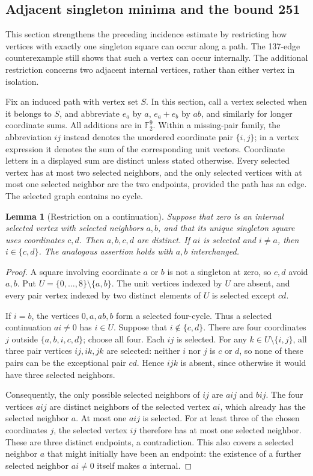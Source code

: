 \documentclass[11pt,a4paper]{article}
\newtheorem{lemma}[theorem]{Lemma}
\theoremstyle{definition}
\theoremstyle{remark}
\begin{document}
\subsection{Adjacent singleton minima and the bound 251}
This section strengthens the preceding incidence estimate by restricting how vertices with exactly one singleton square can occur along a path. The 137-edge counterexample still shows that such a vertex can occur internally. The additional restriction concerns two adjacent internal vertices, rather than either vertex in isolation.

Fix an induced path with vertex set $S$. In this section, call a vertex selected when it belongs to $S$, and abbreviate $e_a$ by $a$, $e_a+e_b$ by $ab$, and similarly for longer coordinate sums. All additions are in $\mathbb F_2^9$. Within a missing-pair family, the abbreviation $ij$ instead denotes the unordered coordinate pair $\{i,j\}$; in a vertex expression it denotes the sum of the corresponding unit vectors. Coordinate letters in a displayed sum are distinct unless stated otherwise. Every selected vertex has at most two selected neighbors, and the only selected vertices with at most one selected neighbor are the two endpoints, provided the path has an edge. The selected graph contains no cycle.

\begin{lemma}[Restriction on a continuation]\label{lem:singleton-arm}
Suppose that zero is an internal selected vertex with selected neighbors $a,b$, and that its unique singleton square uses coordinates $c,d$. Then $a,b,c,d$ are distinct. If $ai$ is selected and $i\ne a$, then $i\in\{c,d\}$. The analogous assertion holds with $a,b$ interchanged.
\end{lemma}
\begin{proof}
A square involving coordinate $a$ or $b$ is not a singleton at zero, so $c,d$ avoid $a,b$. Put $U=\{0,\ldots,8\}\setminus\{a,b\}$. The unit vertices indexed by $U$ are absent, and every pair vertex indexed by two distinct elements of $U$ is selected except $cd$.

If $i=b$, the vertices $0,a,ab,b$ form a selected four-cycle. Thus a selected continuation $ai\ne0$ has $i\in U$. Suppose that $i\notin\{c,d\}$. There are four coordinates $j$ outside $\{a,b,i,c,d\}$; choose all four. Each $ij$ is selected. For any $k\in U\setminus\{i,j\}$, all three pair vertices $ij,ik,jk$ are selected: neither $i$ nor $j$ is $c$ or $d$, so none of these pairs can be the exceptional pair $cd$. Hence $ijk$ is absent, since otherwise it would have three selected neighbors.

Consequently, the only possible selected neighbors of $ij$ are $aij$ and $bij$. The four vertices $aij$ are distinct neighbors of the selected vertex $ai$, which already has the selected neighbor $a$. At most one $aij$ is selected. For at least three of the chosen coordinates $j$, the selected vertex $ij$ therefore has at most one selected neighbor. These are three distinct endpoints, a contradiction. This also covers a selected neighbor $a$ that might initially have been an endpoint: the existence of a further selected neighbor $ai\ne0$ itself makes $a$ internal.
\end{proof}
\end{document}
